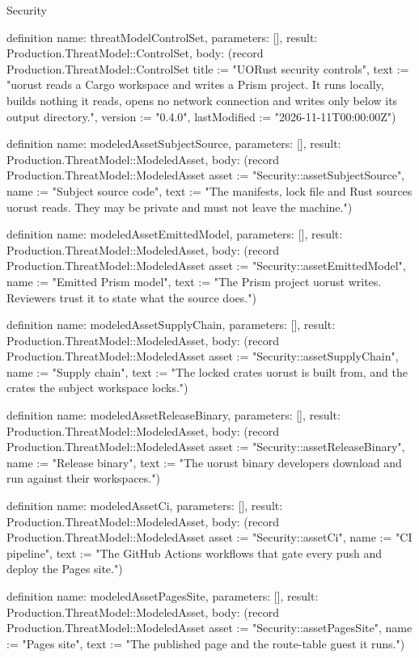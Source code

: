 \begin{lexlean}{Security}
\begin{semanticmodule}
definition{
  name: threatModelControlSet,
  parameters: [],
  result: Production.ThreatModel::ControlSet,
  body: (record Production.ThreatModel::ControlSet {title := "UORust security controls", text := "uorust reads a Cargo workspace and writes a Prism project. It runs locally, builds nothing it reads, opens no network connection and writes only below its output directory.", version := "0.4.0", lastModified := "2026-11-11T00:00:00Z"})
}

definition{
  name: modeledAssetSubjectSource,
  parameters: [],
  result: Production.ThreatModel::ModeledAsset,
  body: (record Production.ThreatModel::ModeledAsset {asset := "Security::assetSubjectSource", name := "Subject source code", text := "The manifests, lock file and Rust sources uorust reads. They may be private and must not leave the machine."})
}

definition{
  name: modeledAssetEmittedModel,
  parameters: [],
  result: Production.ThreatModel::ModeledAsset,
  body: (record Production.ThreatModel::ModeledAsset {asset := "Security::assetEmittedModel", name := "Emitted Prism model", text := "The Prism project uorust writes. Reviewers trust it to state what the source does."})
}

definition{
  name: modeledAssetSupplyChain,
  parameters: [],
  result: Production.ThreatModel::ModeledAsset,
  body: (record Production.ThreatModel::ModeledAsset {asset := "Security::assetSupplyChain", name := "Supply chain", text := "The locked crates uorust is built from, and the crates the subject workspace locks."})
}

definition{
  name: modeledAssetReleaseBinary,
  parameters: [],
  result: Production.ThreatModel::ModeledAsset,
  body: (record Production.ThreatModel::ModeledAsset {asset := "Security::assetReleaseBinary", name := "Release binary", text := "The uorust binary developers download and run against their workspaces."})
}

definition{
  name: modeledAssetCi,
  parameters: [],
  result: Production.ThreatModel::ModeledAsset,
  body: (record Production.ThreatModel::ModeledAsset {asset := "Security::assetCi", name := "CI pipeline", text := "The GitHub Actions workflows that gate every push and deploy the Pages site."})
}

definition{
  name: modeledAssetPagesSite,
  parameters: [],
  result: Production.ThreatModel::ModeledAsset,
  body: (record Production.ThreatModel::ModeledAsset {asset := "Security::assetPagesSite", name := "Pages site", text := "The published page and the route-table guest it runs."})
}


\end{semanticmodule}
\end{lexlean}
